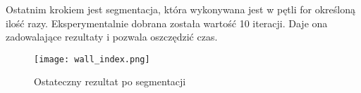 	Ostatnim krokiem jest segmentacja, która wykonywana jest w pętli for określoną ilość razy. Eksperymentalnie dobrana została wartość 10 iteracji. Daje ona zadowalające rezultaty i pozwala oszczędzić czas.\\
	\begin{figure}[h!]
		\centering
		\texttt{[image: wall\_index.png]}
		\caption{Ostateczny rezultat po segmentacji}
		\label{fig:after_segmentation}
	\end{figure}